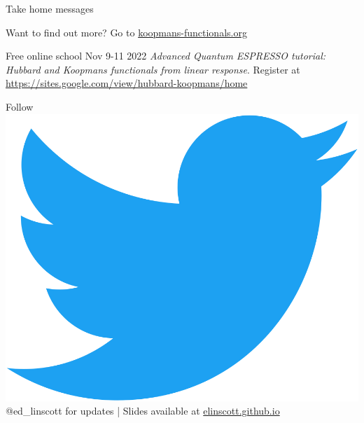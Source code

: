 \documentclass[xcolor=table,aspectratio=169]{beamer}
\numberwithin{equation}{section}
\begin{document}
\begin{frame}{Take home messages}
   \begin{center}
      \scriptsize
      Want to find out more? Go to \url{koopmans-functionals.org}

      Free online school Nov 9-11 2022 \emph{Advanced Quantum ESPRESSO tutorial: Hubbard and Koopmans functionals from linear response}. Register at \url{https://sites.google.com/view/hubbard-koopmans/home}

      Follow \includegraphics[height=\fontcharht\font`\B]{figures/Twitter_Bird.png} \textcolor{twitter_blue}{@ed\_linscott} for updates | Slides available at \url{elinscott.github.io}
   \end{center}


\end{frame}
\end{document}
